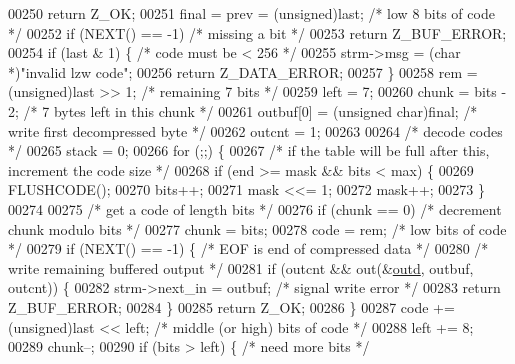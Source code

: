 \begin{DoxyCode}
00250         \textcolor{keywordflow}{return} Z\_OK;
00251     \textcolor{keyword}{final} = prev = (unsigned)last;          \textcolor{comment}{/* low 8 bits of code */}
00252     \textcolor{keywordflow}{if} (NEXT() == -1)                       \textcolor{comment}{/* missing a bit */}
00253         \textcolor{keywordflow}{return} Z\_BUF\_ERROR;
00254     \textcolor{keywordflow}{if} (last & 1) \{                         \textcolor{comment}{/* code must be < 256 */}
00255         strm->msg = (\textcolor{keywordtype}{char} *)\textcolor{stringliteral}{"invalid lzw code"};
00256         \textcolor{keywordflow}{return} Z\_DATA\_ERROR;
00257     \}
00258     rem = (unsigned)last >> 1;              \textcolor{comment}{/* remaining 7 bits */}
00259     left = 7;
00260     chunk = bits - 2;                       \textcolor{comment}{/* 7 bytes left in this chunk */}
00261     outbuf[0] = (\textcolor{keywordtype}{unsigned} char)\textcolor{keyword}{final};       \textcolor{comment}{/* write first decompressed byte */}
00262     outcnt = 1;
00263 
00264     \textcolor{comment}{/* decode codes */}
00265     stack = 0;
00266     \textcolor{keywordflow}{for} (;;) \{
00267         \textcolor{comment}{/* if the table will be full after this, increment the code size */}
00268         \textcolor{keywordflow}{if} (end >= mask && bits < max) \{
00269             FLUSHCODE();
00270             bits++;
00271             mask <<= 1;
00272             mask++;
00273         \}
00274 
00275         \textcolor{comment}{/* get a code of length bits */}
00276         \textcolor{keywordflow}{if} (chunk == 0)                     \textcolor{comment}{/* decrement chunk modulo bits */}
00277             chunk = bits;
00278         code = rem;                         \textcolor{comment}{/* low bits of code */}
00279         \textcolor{keywordflow}{if} (NEXT() == -1) \{                 \textcolor{comment}{/* EOF is end of compressed data */}
00280             \textcolor{comment}{/* write remaining buffered output */}
00281             \textcolor{keywordflow}{if} (outcnt && out(&\hyperlink{structoutd}{outd}, outbuf, outcnt)) \{
00282                 strm->next\_in = outbuf;     \textcolor{comment}{/* signal write error */}
00283                 \textcolor{keywordflow}{return} Z\_BUF\_ERROR;
00284             \}
00285             \textcolor{keywordflow}{return} Z\_OK;
00286         \}
00287         code += (unsigned)last << left;     \textcolor{comment}{/* middle (or high) bits of code */}
00288         left += 8;
00289         chunk--;
00290         \textcolor{keywordflow}{if} (bits > left) \{                  \textcolor{comment}{/* need more bits */}

\end{DoxyCode}

